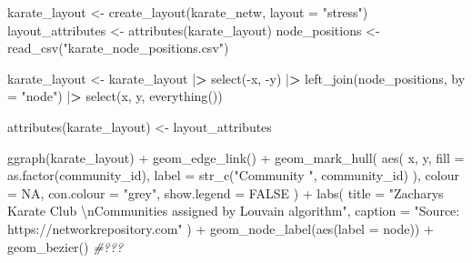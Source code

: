 \documentclass[
]{article}
\newenvironment{Shaded}{\begin{snugshade}}{\end{snugshade}}
\newcommand{\AttributeTok}[1]{\textcolor[rgb]{0.77,0.63,0.00}{#1}}
\newcommand{\CommentTok}[1]{\textcolor[rgb]{0.56,0.35,0.01}{\textit{#1}}}
\newcommand{\ConstantTok}[1]{\textcolor[rgb]{0.00,0.00,0.00}{#1}}
\newcommand{\ErrorTok}[1]{\textcolor[rgb]{0.64,0.00,0.00}{\textbf{#1}}}
\newcommand{\FunctionTok}[1]{\textcolor[rgb]{0.00,0.00,0.00}{#1}}
\newcommand{\NormalTok}[1]{#1}
\newcommand{\OtherTok}[1]{\textcolor[rgb]{0.56,0.35,0.01}{#1}}
\newcommand{\SpecialCharTok}[1]{\textcolor[rgb]{0.00,0.00,0.00}{#1}}
\newcommand{\StringTok}[1]{\textcolor[rgb]{0.31,0.60,0.02}{#1}}
\begin{document}
\begin{Shaded}
\begin{Highlighting}[]
\NormalTok{karate\_layout }\OtherTok{\textless{}{-}} \FunctionTok{create\_layout}\NormalTok{(karate\_netw, }\AttributeTok{layout =} \StringTok{"stress"}\NormalTok{)}
\NormalTok{layout\_attributes }\OtherTok{\textless{}{-}} \FunctionTok{attributes}\NormalTok{(karate\_layout)}
\NormalTok{node\_positions }\OtherTok{\textless{}{-}} \FunctionTok{read\_csv}\NormalTok{(}\StringTok{"karate\_node\_positions.csv"}\NormalTok{)}

\NormalTok{karate\_layout }\OtherTok{\textless{}{-}}
\NormalTok{  karate\_layout }\SpecialCharTok{|}\ErrorTok{\textgreater{}}
  \FunctionTok{select}\NormalTok{(}\SpecialCharTok{{-}}\NormalTok{x, }\SpecialCharTok{{-}}\NormalTok{y) }\SpecialCharTok{|}\ErrorTok{\textgreater{}}
  \FunctionTok{left\_join}\NormalTok{(node\_positions, }\AttributeTok{by =} \StringTok{"node"}\NormalTok{) }\SpecialCharTok{|}\ErrorTok{\textgreater{}}
  \FunctionTok{select}\NormalTok{(x, y, }\FunctionTok{everything}\NormalTok{())}

\FunctionTok{attributes}\NormalTok{(karate\_layout) }\OtherTok{\textless{}{-}}\NormalTok{ layout\_attributes}

\FunctionTok{ggraph}\NormalTok{(karate\_layout) }\SpecialCharTok{+}
  \FunctionTok{geom\_edge\_link}\NormalTok{() }\SpecialCharTok{+}
    \FunctionTok{geom\_mark\_hull}\NormalTok{(}
    \FunctionTok{aes}\NormalTok{(}
\NormalTok{      x, }
\NormalTok{      y, }
      \AttributeTok{fill =} \FunctionTok{as.factor}\NormalTok{(community\_id), }
      \AttributeTok{label =} \FunctionTok{str\_c}\NormalTok{(}\StringTok{"Community "}\NormalTok{, community\_id)}
\NormalTok{      ), }
    \AttributeTok{colour =} \ConstantTok{NA}\NormalTok{, }
    \AttributeTok{con.colour =} \StringTok{"grey"}\NormalTok{, }
    \AttributeTok{show.legend =} \ConstantTok{FALSE}
\NormalTok{  ) }\SpecialCharTok{+}
  \FunctionTok{labs}\NormalTok{(}
    \AttributeTok{title =} \StringTok{"Zachary\textquotesingle{}s Karate Club }\SpecialCharTok{\textbackslash{}n}\StringTok{Communities assigned by Louvain algorithm"}\NormalTok{,}
    \AttributeTok{caption =} \StringTok{"Source: https://networkrepository.com"}
\NormalTok{  ) }\SpecialCharTok{+}
  \FunctionTok{geom\_node\_label}\NormalTok{(}\FunctionTok{aes}\NormalTok{(}\AttributeTok{label =}\NormalTok{ node)) }\SpecialCharTok{+}
  \FunctionTok{geom\_bezier}\NormalTok{() }\CommentTok{\#???}
\end{Highlighting}
\end{Shaded}
\end{document}
